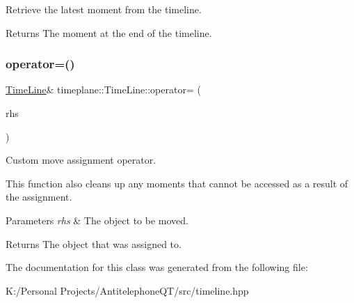 Retrieve the latest moment from the timeline. 

\begin{DoxyReturn}{Returns}
The moment at the end of the timeline. 
\end{DoxyReturn}
\mbox{\label{classtimeplane_1_1_time_line_a14e1d9701e1a6571458343e0831855b6}} 
\subsubsection{\texorpdfstring{operator=()}{operator=()}}
{\footnotesize\ttfamily \hyperlink{classtimeplane_1_1_time_line}{Time\+Line}\& timeplane\+::\+Time\+Line\+::operator= (\begin{DoxyParamCaption}\item[{\hyperlink{classtimeplane_1_1_time_line}{Time\+Line} \&\&}]{rhs }\end{DoxyParamCaption})\hspace{0.3cm}{\ttfamily [inline]}}



Custom move assignment operator. 

This function also cleans up any moments that cannot be accessed as a result of the assignment. 
\begin{DoxyParams}{Parameters}
{\em rhs} & The object to be moved. \\
\hline
\end{DoxyParams}
\begin{DoxyReturn}{Returns}
The object that was assigned to. 
\end{DoxyReturn}


The documentation for this class was generated from the following file\+:\begin{DoxyCompactItemize}
\item 
K\+:/\+Personal Projects/\+Antitelephone\+Q\+T/src/timeline.\+hpp\end{DoxyCompactItemize}
